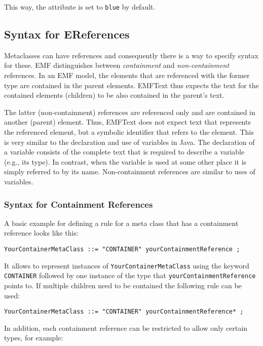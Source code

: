 This way, the attribute is set to \texttt{blue} by default.

\subsection{Syntax for EReferences}

Metaclasses can have references and consequently there is a way to specify 
syntax for these. EMF distinguishes between \emph{containment} and
\emph{non-containment} references. In an EMF model, the elements that are
referenced with the former type are contained in the parent elements. EMFText
thus expects the text for the contained elements (children) to be also 
contained in the parent's text. 

The latter (non-containment) references are referenced only and are contained in
another (parent) element. Thus, EMFText does not expect text that
represents the referenced element, but a symbolic identifier that refers
to the element. This is very similar to the declaration and use of variables in Java.
The declaration of a variable consists of the complete text that is required to
describe a variable (e.g., its type). In contrast, when the variable is used at
some other place it is simply referred to by its name. Non-containment
references are similar to uses of variables.

\subsubsection{Syntax for Containment References}

A basic example for defining a rule for a meta class that has a containment 
reference looks like this:

\lstset{language=CS}
\begin{lstlisting}
YourContainerMetaClass ::= "CONTAINER" yourContainmentReference ;
\end{lstlisting}

It allows to represent instances of \texttt{YourContainerMetaClass} using the
keyword \texttt{CONTAINER} followed by one instance of the type that
\texttt{yourContainmentReference} points to. If multiple children need to be
contained the following rule can be used:

\lstset{language=CS}
\begin{lstlisting}
YourContainerMetaClass ::= "CONTAINER" yourContainmentReference* ;
\end{lstlisting}

In addition, each containment reference can be restricted to allow only certain 
types, for example:

